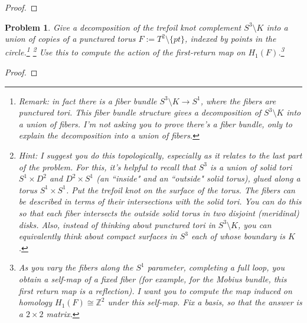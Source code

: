 \documentclass[11pt]{article}
\newtheorem{problem}{Problem}
\begin{document}
\begin{proof}

\end{proof}



\pagebreak 


\begin{problem}
Give a decomposition of the trefoil knot complement $S^3\setminus K$ into a union of copies of a punctured torus $F:=T^2\setminus\{pt\}$, indexed by points in the circle.\footnote{Remark: in fact there is a fiber bundle $S^3\setminus K\to S^1$, where the fibers are punctured tori. This fiber bundle structure gives a decomposition of $S^3\setminus K$ into a union of fibers. I'm not asking you to prove there's a fiber bundle, only to explain the decomposition into a union of fibers.} \footnote{Hint: I suggest you do this topologically, especially as it relates to the last part of the problem. For this, it's helpful to recall that $S^3$ is a union of solid tori $S^1\times D^2$ and $D^2\times S^1$ (an ``inside" and an ``outside" solid torus), glued along a torus $S^1\times S^1$. Put the trefoil knot on the surface of the torus. The fibers can be described in terms of their intersections with the solid tori. You can do this so that each fiber intersects the outside solid torus in two disjoint (meridinal) disks. Also, instead of thinking about punctured tori in $S^3\setminus K$, you can equivalently think about compact surfaces in $S^3$ each of whose boundary is $K$.} 
Use this to compute the action of the first-return map on $H_1(F)$.\footnote{As you vary the fibers along the $S^1$ parameter, completing a full loop, you obtain a self-map of a fixed fiber (for example, for the Mobius bundle, this first return map is a reflection). I want you to compute the map induced on homology $H_1(F)\cong\mathbb Z^2$ under this self-map. Fix a basis, so that the answer is a $2\times 2$ matrix. } 
\end{problem}

\begin{proof}

\end{proof}
\end{document}
